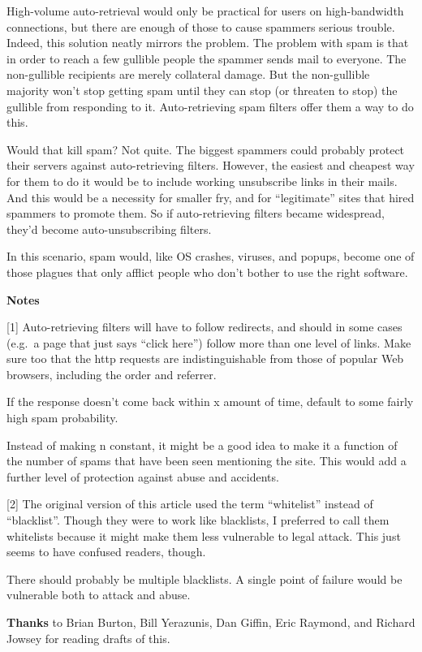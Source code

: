 High-volume auto-retrieval would only be practical for users on
high-bandwidth connections, but there are enough of those to cause
spammers serious trouble. Indeed, this solution neatly mirrors the
problem. The problem with spam is that in order to reach a few gullible
people the spammer sends mail to everyone. The non-gullible recipients
are merely collateral damage. But the non-gullible majority won't stop
getting spam until they can stop (or threaten to stop) the gullible from
responding to it. Auto-retrieving spam filters offer them a way to do
this.

Would that kill spam? Not quite. The biggest spammers could probably
protect their servers against auto-retrieving filters. However, the
easiest and cheapest way for them to do it would be to include working
unsubscribe links in their mails. And this would be a necessity for
smaller fry, and for ``legitimate'' sites that hired spammers to promote
them. So if auto-retrieving filters became widespread, they'd become
auto-unsubscribing filters.

In this scenario, spam would, like OS crashes, viruses, and popups,
become one of those plagues that only afflict people who don't bother to
use the right software.

\textbf{Notes}

{[}1{]} Auto-retrieving filters will have to follow redirects, and
should in some cases (e.g.~a page that just says ``click here'') follow
more than one level of links. Make sure too that the http requests are
indistinguishable from those of popular Web browsers, including the
order and referrer.

If the response doesn't come back within x amount of time, default to
some fairly high spam probability.

Instead of making n constant, it might be a good idea to make it a
function of the number of spams that have been seen mentioning the site.
This would add a further level of protection against abuse and
accidents.

{[}2{]} The original version of this article used the term ``whitelist''
instead of ``blacklist''. Though they were to work like blacklists, I
preferred to call them whitelists because it might make them less
vulnerable to legal attack. This just seems to have confused readers,
though.

There should probably be multiple blacklists. A single point of failure
would be vulnerable both to attack and abuse.

\textbf{Thanks} to Brian Burton, Bill Yerazunis, Dan Giffin, Eric
Raymond, and Richard Jowsey for reading drafts of this.
